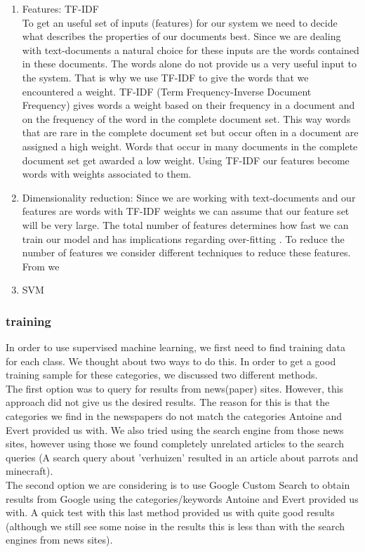 \begin{enumerate}
\item Features: TF-IDF \\ 
To get an useful set of inputs (features) for our system we need to decide what describes the properties of our documents best. Since we are dealing with text-documents a natural choice for these inputs are the words contained in these documents. 
The words alone do not provide us a very useful input to the system. That is why we use TF-IDF to give the words that we encountered a weight. TF-IDF (Term Frequency-Inverse Document Frequency) gives words a weight based on their frequency in a document and on the frequency of the word in the complete document set. This way words that are rare in the complete document set but occur often in a document are assigned a high weight. Words that occur in many documents in the complete document set get awarded a low weight\cite{ramos_tfidf}.
Using TF-IDF our features become words with weights associated to them.

\item Dimensionality reduction: 
Since we are working with text-documents and our features are words with TF-IDF weights we can assume that our feature set will be very large. The total number of features determines how fast we can train our model and has implications regarding over-fitting \cite{ml_text}. To reduce the number of features we consider different techniques to reduce these features. From \cite{ml_text} we 


\item SVM
\end{enumerate}

\subsubsection{training}
In order to use supervised machine learning, we first need to find training data for each class. We thought about two ways to do this. In order to get a good training sample for these categories, we discussed two different methods. \\

The first option was to query for results from news(paper) sites. However, this approach did not give us the desired results. The reason for this is that the categories we find in the newspapers do not match the categories Antoine and Evert provided us with. We also tried using the search engine from those news sites, however using those we found completely unrelated articles to the search queries (A search query about 'verhuizen' resulted in an article about parrots and minecraft).\\

The second option we are considering is to use Google Custom Search to obtain results from Google using the categories/keywords Antoine and Evert provided us with. A quick test with this last method provided us with quite good results (although we still see some noise in the results this is less than with the search engines from news sites).\\